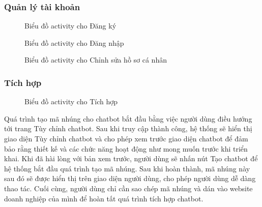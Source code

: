 \subsubsection{Quản lý tài khoản}
\begin{figure}[H]
    \centering
     
    \vspace{0.5cm}
    \caption{Biểu đồ activity cho Đăng ký}
    \label{fig:enter-label}
\end{figure}
\begin{figure}[H]
    \centering
     
    \vspace{0.5cm}
    \caption{Biểu đồ activity cho Đăng nhập}
    \label{fig:enter-label}
\end{figure}
\begin{figure}[H]
    \centering
     
    \vspace{0.5cm}
    \caption{Biểu đồ activity cho Chỉnh sửa hồ sơ cá nhân}
    \label{fig:enter-label}
\end{figure}
\subsubsection{Tích hợp}
\begin{figure}[H]
    \centering
     
    \vspace{0.5cm}
    \caption{Biểu đồ activity cho Tích hợp}
    \label{fig:enter-label}
\end{figure}

\par Quá trình tạo mã nhúng cho chatbot bắt đầu bằng việc người dùng điều hướng tới trang Tùy chỉnh chatbot. Sau khi truy cập thành công, hệ thống sẽ hiển thị giao diện Tùy chỉnh chatbot và cho phép xem trước giao diện chatbot để đảm bảo rằng thiết kế và các chức năng hoạt động như mong muốn trước khi triển khai. Khi đã hài lòng với bản xem trước, người dùng sẽ nhấn nút Tạo chatbot để hệ thống bắt đầu quá trình tạo mã nhúng. Sau khi hoàn thành, mã nhúng này sau đó sẽ được hiển thị trên giao diện người dùng, cho phép người dùng dễ dàng thao tác. Cuối cùng, người dùng chỉ cần sao chép mã nhúng và dán vào website doanh nghiệp của mình để hoàn tất quá trình tích hợp chatbot.

